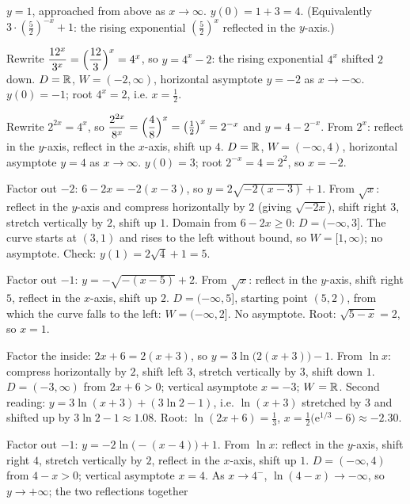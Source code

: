 \begin{solutions}
        $y=1$, approached from above as $x\to\infty$. $y(0)=1+3=4$.
        (Equivalently $3\cdot(\tfrac52)^{-x}+1$: the rising exponential
        $(\tfrac52)^{x}$ reflected in the $y$-axis.)
  \item Rewrite $\dfrac{12^{x}}{3^{x}}=\Bigl(\dfrac{12}{3}\Bigr)^{x}=4^{x}$,
        so $y=4^{x}-2$: the rising exponential $4^{x}$ shifted $2$ down.
        $D=\mathbb{R}$, $W=(-2,\infty)$, horizontal asymptote $y=-2$ as
        $x\to-\infty$. $y(0)=-1$; root $4^{x}=2$, i.e. $x=\tfrac12$.
  \item Rewrite $2^{2x}=4^{x}$, so $\dfrac{2^{2x}}{8^{x}}
        =\Bigl(\dfrac48\Bigr)^{x}=\bigl(\tfrac12\bigr)^{x}=2^{-x}$ and
        $y=4-2^{-x}$. From $2^{x}$: reflect in the $y$-axis, reflect in the
        $x$-axis, shift up $4$. $D=\mathbb{R}$, $W=(-\infty,4)$, horizontal
        asymptote $y=4$ as $x\to\infty$. $y(0)=3$; root $2^{-x}=4=2^{2}$,
        so $x=-2$.
  \item Factor out $-2$: $6-2x=-2(x-3)$, so $y=2\sqrt{-2(x-3)}+1$. From
        $\sqrt{x}$: reflect in the $y$-axis and compress horizontally by
        $2$ (giving $\sqrt{-2x}$), shift right $3$, stretch vertically by
        $2$, shift up $1$. Domain from $6-2x\ge0$: $D=(-\infty,3]$. The
        curve starts at $(3,1)$ and rises to the left without bound, so
        $W=[1,\infty)$; no asymptote. Check: $y(1)=2\sqrt4+1=5$.
  \item Factor out $-1$: $y=-\sqrt{-(x-5)}+2$. From $\sqrt{x}$: reflect in
        the $y$-axis, shift right $5$, reflect in the $x$-axis, shift up
        $2$. $D=(-\infty,5]$, starting point $(5,2)$, from which the curve
        falls to the left: $W=(-\infty,2]$. No asymptote. Root:
        $\sqrt{5-x}=2$, so $x=1$.
  \item Factor the inside: $2x+6=2(x+3)$, so $y=3\ln\bigl(2(x+3)\bigr)-1$.
        From $\ln x$: compress horizontally by $2$, shift left $3$, stretch
        vertically by $3$, shift down $1$. $D=(-3,\infty)$ from $2x+6>0$;
        vertical asymptote $x=-3$; $W=\mathbb{R}$. Second reading:
        $y=3\ln(x+3)+(3\ln2-1)$, i.e. $\ln(x+3)$ stretched by $3$ and
        shifted up by $3\ln2-1\approx1.08$. Root: $\ln(2x+6)=\tfrac13$,
        $x=\tfrac12\bigl(\mathrm{e}^{1/3}-6\bigr)\approx-2.30$.
  \item Factor out $-1$: $y=-2\ln\bigl(-(x-4)\bigr)+1$. From $\ln x$:
        reflect in the $y$-axis, shift right $4$, stretch vertically by
        $2$, reflect in the $x$-axis, shift up $1$. $D=(-\infty,4)$ from
        $4-x>0$; vertical asymptote $x=4$. As $x\to4^{-}$,
        $\ln(4-x)\to-\infty$, so $y\to+\infty$; the two reflections together

\end{solutions}
